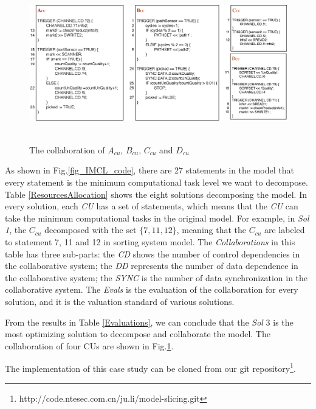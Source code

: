 \begin{figure}[!htb]
    \centering
        \includegraphics[height=2.7in, width=6.0in]{fig_four_collaborated_program}
    \caption{The collaboration of $A_{cu}$, $B_{cu}$, $C_{cu}$ and $D_{cu}$}\label{fig_four_collaborated_program}
\end{figure}

As shown in Fig.\ref{fig_IMCL_code}, there are 27 statements in the model that every statement is the minimum computational task level we want to decompose. Table \ref{ResourcesAllocation} shows the eight solutions decomposing the model. In every solution, each \emph{CU} has a set of statements, which means that the \emph{CU} can take the minimum computational tasks in the original model. For example, in \emph{Sol 1}, the $C_{cu}$ decomposed with the set $\{7,11,12\}$, meaning that the $C_{cu}$ are labeled to statement 7, 11 and 12 in sorting system model. The \emph{Collaborations} in this table has three sub-parts: the \emph{CD} shows the number of control dependencies in the collaborative system; the \emph{DD} represents the number of data dependence in the collaborative system; the \emph{SYNC} is the number of data synchronization in the collaborative system. The \emph{Evals} is the evaluation of the collaboration for every solution, and it is the valuation standard of various solutions.

From the results in Table \ref{Evaluations}, we can conclude that the \emph{Sol} 3 is the most optimizing solution to decompose and collaborate the model. The collaboration of four CUs are shown in Fig.\ref{fig_four_collaborated_program}.

The implementation of this case study can be cloned from our git repository\footnote{http://code.ntesec.com.cn/ju.li/model-slicing.git}.


